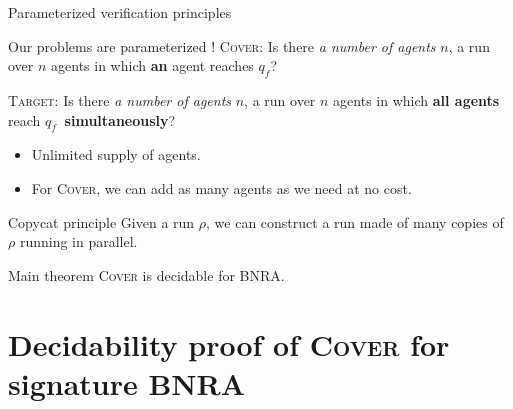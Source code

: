 \documentclass{beamer}
\newcommand{\COVER}{\textsc{Cover}}
\newcommand{\TARGET}{\textsc{Target}}
\begin{document}
\begin{frame}{Parameterized verification principles}
	
	\begin{block}{Our problems are parameterized !}
		{\COVER{}}: Is there \emph{a number of agents} $n$, a run over $n$ agents in which \textbf{an} agent reaches \color{blue!60}$q_f$\color{black}?
		
		{\TARGET{}}: Is there \emph{a number of agents} $n$, a run over $n$ agents in which \textbf{all agents} reach \color{blue!60}$q_f~$\color{black} \textbf{simultaneously}?
	\end{block}
	
	\pause

	\begin{itemize}
		\item Unlimited supply of agents.
		
		\item For {\COVER{}}, we can add as many agents as we need at no cost. 
	\end{itemize}
	
	\pause
	
	\begin{block}{Copycat principle}
		Given a run $\rho$, we can construct a run made of many copies of $\rho$ running in parallel.
	\end{block}
	
	\pause 

	\begin{block}{Main theorem}
		{\COVER{}} is decidable for BNRA.
	\end{block}
	
\end{frame}







\section{Decidability proof of \COVER{} for signature BNRA}
\end{document}
